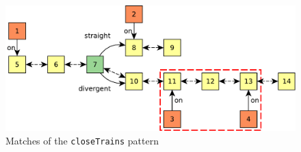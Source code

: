 \begin{figure}[H]
	\begin{center}
		\includegraphics[width=\textwidth]{figures/query-example-model-closetrains.pdf}
	\end{center}
	\caption{Matches of the \texttt{closeTrains} pattern}
	\label{fig:match-closeTrains}
\end{figure}









